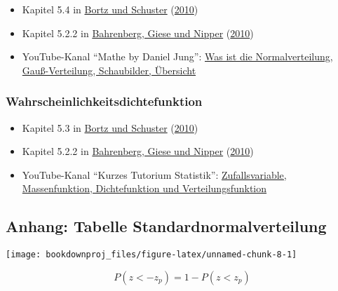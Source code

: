 \documentclass[
  ngerman,
]{article}
\providecommand{\tightlist}{%
  \setlength{\itemsep}{0pt}\setlength{\parskip}{0pt}}
\begin{document}
\begin{itemize}
\tightlist
\item
  Kapitel 5.4 in \protect\hyperlink{ref-bortz}{Bortz und Schuster} (\protect\hyperlink{ref-bortz}{2010})
\item
  Kapitel 5.2.2 in \protect\hyperlink{ref-bahrenberg}{Bahrenberg, Giese und Nipper} (\protect\hyperlink{ref-bahrenberg}{2010})
\item
  YouTube-Kanal ``Mathe by Daniel Jung'': \href{https://www.youtube.com/watch?v=_f1vgWUiavY}{Was ist die Normalverteilung, Gauß-Verteilung, Schaubilder, Übersicht}
\end{itemize}

\hypertarget{wahrscheinlichkeitsdichtefunktion}{%
\subsubsection{Wahrscheinlichkeitsdichtefunktion}\label{wahrscheinlichkeitsdichtefunktion}}

\begin{itemize}
\tightlist
\item
  Kapitel 5.3 in \protect\hyperlink{ref-bortz}{Bortz und Schuster} (\protect\hyperlink{ref-bortz}{2010})
\item
  Kapitel 5.2.2 in \protect\hyperlink{ref-bahrenberg}{Bahrenberg, Giese und Nipper} (\protect\hyperlink{ref-bahrenberg}{2010})
\item
  YouTube-Kanal ``Kurzes Tutorium Statistik'': \href{https://www.youtube.com/watch?v=DoHTsDrzAQk}{Zufallsvariable, Massenfunktion, Dichtefunktion und Verteilungsfunktion}
\end{itemize}

\pagebreak

\hypertarget{ptab}{%
\subsection{Anhang: Tabelle Standardnormalverteilung}\label{ptab}}

\begin{multicols}{2}


\begin{center}\texttt{[image: bookdownproj\_files/figure-latex/unnamed-chunk-8-1]} \end{center}

\[ P(z < -z_p) = 1-P(z< z_p) \]

\end{multicols}
\end{document}
